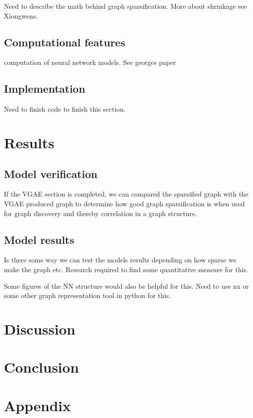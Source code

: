 \documentclass[honours,12pt]{unswthesis}
\numberwithin{equation}{section}
\begin{document}
Need to describe the math behind graph sparsification. More about shrinkage see Xiongwens.

{\section{Computational features}}\label{computation}
computation of neural network models. See georges paper 
{\section{Implementation}}\label{implementation}

Need to finish code to finish this section.

\chapter{Results}\label{results}

{\section{Model verification}}\label{model-verification}
If the VGAE section is completed, we can compared the sparsified graph with the VGAE
produced graph to determine how good graph sparsification is when used for graph discovery
and thereby correlation in a graph structure.

{\section{Model results}}\label{model-results}
Is there some way we can test the models results depending on how sparse we make the graph etc.
Research required to find some quantitative measure for this.

Some figures of the NN structure would also be helpful for this.
Need to use nx or some other graph representation tool in python for this.

\chapter{Discussion}\label{dis}

\chapter{Conclusion}\label{ccl}

\chapter{Appendix}\label{app}



\clearpage
{}
{}

\end{document}
